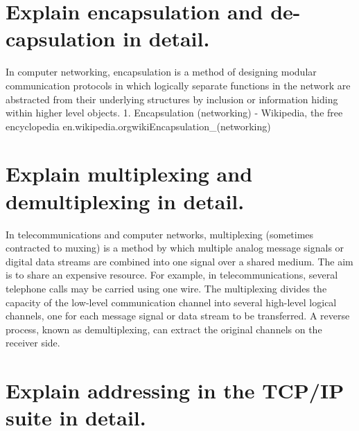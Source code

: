 \documentclass[a4paper,12pt]{report}
\begin{document}
\section*{Explain encapsulation and de-capsulation in detail.}
In computer networking, encapsulation is a method of designing modular communication protocols in which logically separate functions in the network are abstracted from their underlying structures by inclusion or information hiding within higher level objects. 
1. Encapsulation (networking) - Wikipedia, the free encyclopedia
en.wikipedia.org\/wiki\/Encapsulation\_(networking)\cite[Encapsulation (networking)]{wikipedia}

\section*{Explain multiplexing and demultiplexing in detail.}
In telecommunications and computer networks, multiplexing (sometimes contracted to muxing) is a method by which multiple analog message signals or digital data streams are combined into one signal over a shared medium. The aim is to share an expensive resource. For example, in telecommunications, several telephone calls may be carried using one wire. The multiplexing divides the capacity of the low-level communication channel into several high-level logical channels, one for each message signal or data stream to be transferred. A reverse process, known as demultiplexing, can extract the original channels on the receiver side.


\section*{Explain addressing in the TCP/IP suite in detail.}
\end{document}
